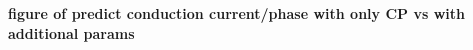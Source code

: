 \documentclass[12pt]{iopart}
\begin{document}

\textbf{figure of predict conduction current/phase with only CP vs with additional params}
\end{document}

